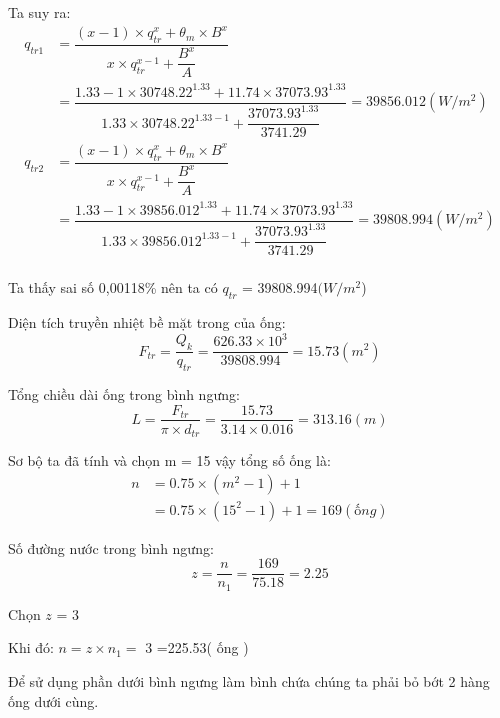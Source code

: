 Ta suy ra:
\begin{equation*}
	\begin{split}
	q_{tr1} &= \dfrac{(x - 1)\times q_{tr}^{x} + \theta_{m}\times B^{x}}{x\times q_{tr}^{x-1} + \dfrac{B^{x}}{A}}\\
	& = \dfrac{1.33-1 \times 30748.22^{1.33} + 11.74 \times 37073.93^{1.33}}{1.33 \times 30748.22^{1.33-1}+\dfrac{37073.93^{1.33}}{3741.29}}=39856.012(W/m^2)\\
	q_{tr2} &= \dfrac{(x - 1)\times q_{tr}^{x} + \theta_{m}\times B^{x}}{x\times q_{tr}^{x-1} + \dfrac{B^{x}}{A}}\\
	& = \dfrac{1.33-1 \times 39856.012^{1.33} + 11.74 \times 37073.93^{1.33}}{1.33 \times 39856.012^{1.33-1}+\dfrac{37073.93^{1.33}}{3741.29}}=39808.994(W/m^2)\\
	\end{split}
\end{equation*}

Ta thấy sai số 0,00118\% nên ta có $q_{tr}$ = 39808.994$(W/m^2$)

Diện tích truyền nhiệt bề mặt trong của ống:
\begin{equation*}
	F_{tr} = \dfrac{Q_{k}}{q_{tr}} = \dfrac{626.33 \times 10^3}{39808.994}=15.73(m^2)
\end{equation*}

Tổng chiều dài ống trong bình ngưng:
\begin{equation*}
	L = \dfrac{F_{tr}}{\pi\times d_{tr}} = \dfrac{15.73}{3.14 \times 0.016}= 313.16(m)
\end{equation*}

Sơ bộ ta đã tính và chọn m = 15 vậy tổng số ống là:
\begin{equation*}
	\begin{split}
		n &= 0.75\times (m^2 - 1) + 1\\
		&=0.75 \times (15^2-1)+1 = 169(ống)
	\end{split}
\end{equation*}

Số đường nước trong bình ngưng:
\begin{equation*}
	z = \dfrac{n}{n_{1}} = \dfrac{169}{75.18} = 2.25 
\end{equation*}

Chọn $z$ = 3

Khi đó: $n = z\times n_{1} = $ 3 =225.53( ống ) 



Để sử dụng phần dưới bình ngưng làm bình chứa chúng ta phải bỏ bớt 2 hàng ống dưới cùng.

